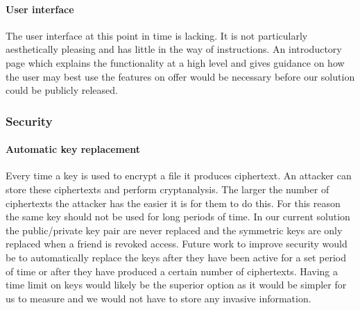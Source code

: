 \documentclass[12pt, titlepage]{article}
\begin{document}
\paragraph*{User interface} The user interface at this point in time is lacking. It is not particularly aesthetically pleasing and has little in the way of instructions. An introductory page which explains the functionality at a high level and gives guidance on how the user may best use the features on offer would be necessary before our solution could be publicly released.

\subsubsection*{Security}
\paragraph*{Automatic key replacement} Every time a key is used to encrypt a file it produces ciphertext. An attacker can store these ciphertexts and perform cryptanalysis. The larger the number of ciphertexts the attacker has the easier it is for them to do this. For this reason the same key should not be used for long periods of time. In our current solution the public/private key pair are never replaced and the symmetric keys are only replaced when a friend is revoked access. Future work to improve security would be to automatically replace the keys after they have been active for a set period of time or after they have produced a certain number of ciphertexts. Having a time limit on keys would likely be the superior option as it would be simpler for us to measure and we would not have to store any invasive information.
\end{document}
